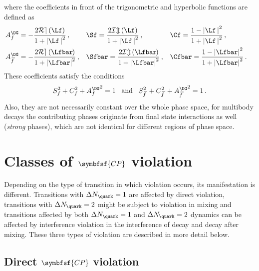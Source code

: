 where the coefficients in front of the trigonometric and hyperbolic functions are defined as
\begin{align}
&A_f^{\DG}=-\frac{2\mathcal{R{}e}\left(\Lf\right)}{1+\left|\Lf\,\right|^2}\,,&
&\Sf=\frac{2\mathcal{I{}m}\left(\Lf\right)}{1+\left|\Lf\,\right|^2}\,,&
&\Cf=\frac{1-\left|\Lf\,\right|^2}{1+\left|\Lf\,\right|^2}\,,&\label{eq:cpcoeff}\\
&A_{\kern 1.5pt\overline{\kern -1.5pt f\kern 1.5pt}}^{\DG}=-\frac{2\mathcal{R{}e}\left(\Lfbar\kern -0.1em\right)}{1+\left|\Lfbar\right|^2}\,,&
&\Sfbar=\frac{2\mathcal{I{}m}\left(\Lfbar\kern -0.1em\right)}{1+\left|\Lfbar\right|^2}\,,&
&\Cfbar=\frac{1-\left|\Lfbar\right|^2}{1+\left|\Lfbar\right|^2}\,.&\label{eq:cpcoeffbar}
\end{align}
These coefficients satisfy the conditions
\begin{equation}
S_{f}^2+C_{f}^2+{A_f^{\DG}}^2=1\,\,\,\,\,\text{and}\,\,\,\,\,S_{\kern 1.5pt\overline{\kern -1.5pt f\kern 1.5pt}}^2+C_{\kern 1.5pt\overline{\kern -1.5pt f\kern 1.5pt}}^2+{A_{\kern 1.5pt\overline{\kern -1.5pt f\kern 1.5pt}}^{\DG}}^2=1\,.\label{eq:CpCoeffCond}
\end{equation}
Also, they are not necessarily constant over the whole phase space, \ie for multibody decays the contributing phases originate from final state interactions as well (\ie \emph{strong} phases), which are not identical for different regions of phase space.

\newpage

\section[head={Classes of \CP violation},tocentry={Classes of \CP violation}]{Classes of $\symbfsf{C{}P}$ violation}
\label{sec:CPVClasses}

Depending on the type of transition in which \CP violation occurs, its manifestation is different.
Transitions with $\Delta N_\quark=1$ are affected by direct \CP violation, transitions with $\Delta N_\quark=2$ might be subject to \CP violation in mixing and
transitions affected by both $\Delta N_\quark=1$ and $\Delta N_\quark=2$ dynamics can be affected by interference \CP violation in the interference of decay and decay after mixing.
These three types of \CP violation are described in more detail below.

\subsection[head={Direct \CP violation},tocentry={Direct \CP violation}]{Direct $\symbfsf{C{}P}$ violation}
\label{sec:DirectCPV}

